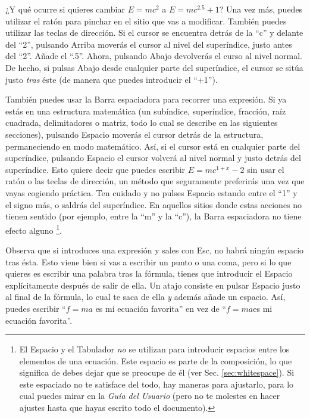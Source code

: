 ¿Y qué ocurre si quieres cambiar $E=mc^{2}$ a $E=mc^{2.5}+1$? Una
vez más, puedes utilizar el ratón para pinchar en el sitio que vas
a modificar. También puedes utilizar las teclas de dirección. Si el
cursor se encuentra detrás de la {}``c'' y delante del {}``2'',
pulsando \textsf{Arriba} moverás el cursor al nivel del superíndice,
justo antes del {}``2''. Añade el {}``.5''. Ahora, pulsando \textsf{Abajo}
devolverás el curso al nivel normal. De hecho, si pulsas \textsf{Abajo}
desde cualquier parte del superíndice, el cursor se sitúa justo \emph{tras}
éste (de manera que puedes introducir el {}``+1'').

También puedes usar la \textsf{Barra espaciadora} para recorrer una
expresión. Si ya estás en una estructura matemática (un subíndice,
superíndice, fracción, raíz cuadrada, delimitadores o matriz, todo
lo cual se describe en las siguientes secciones), pulsando \textsf{Espacio}
moverás el cursor detrás de la estructura, permaneciendo en modo matemático.
Así, si el cursor está en cualquier parte del superíndice, pulsando
\textsf{Espacio} el cursor volverá al nivel normal y justo detrás
del superíndice. Esto quiere decir que puedes escribir $E=mc^{1+x}-2$
sin usar el ratón o las teclas de dirección, un método que seguramente
preferirás una vez que vayas cogiendo práctica. Ten cuidado y no pulses
\textsf{Espacio} estando entre el {}``1'' y el signo más, o saldrás
del superíndice. En aquellos sitios donde estas acciones no tienen
sentido (por ejemplo, entre la {}``m'' y la {}``c''), la \textsf{Barra
espaciadora} no tiene efecto alguno%
\footnote{El \textsf{Espacio} y el \textsf{Tabulador} \emph{no} se utilizan
para introducir espacios entre los elementos de una ecuación. Este
espacio es parte de la composición, lo que significa de debes dejar
que \LyX{} se preocupe de él (ver Sec. \ref{sec:whitespace}). Si
este espaciado no te satisface del todo, hay maneras para ajustarlo,
para lo cual puedes mirar en la \emph{Guía del Usuario} (pero no te
molestes en hacer ajustes hasta que hayas escrito todo el documento).%
}.

Observa que si introduces una expresión y sales con \textsf{Esc},
no habrá ningún espacio tras ésta. Esto viene bien si vas a escribir
un punto o una coma, pero si lo que quieres es escribir una palabra
tras la fórmula, tienes que introducir el \textsf{Espacio} explícitamente
después de salir de ella. Un atajo consiste en pulsar \textsf{Espacio}
justo al final de la fórmula, lo cual te saca de ella \emph{y} además
añade un espacio. Así, puedes escribir {}``$f=ma$ es mi ecuación
favorita'' en vez de {}``$f=ma$es mi ecuación favorita''.


